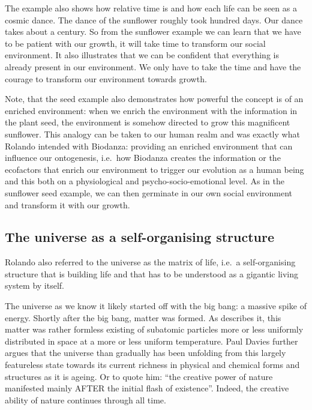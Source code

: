 \documentclass[
  11pt,
]{book}
\begin{document}
The example also shows how relative time is and how each life can be seen as a cosmic dance. The dance of the sunflower roughly took hundred days. Our dance takes about a century. So from the sunflower example we can learn that we have to be patient with our growth, it will take time to transform our social environment. It also illustrates that we can be confident that everything is already present in our environment. We only have to take the time and have the courage to transform our environment towards growth.

Note, that the seed example also demonstrates how powerful the concept is of an enriched environment: when we enrich the environment with the information in the plant seed, the environment is somehow directed to grow this magnificent sunflower. This analogy can be taken to our human realm and was exactly what Rolando intended with Biodanza: providing an enriched environment that can influence our ontogenesis, i.e.~how Biodanza creates the information or the ecofactors that enrich our environment to trigger our evolution as a human being and this both on a physiological and psycho-socio-emotional level. As in the sunflower seed example, we can then germinate in our own social environment and transform it with our growth.

\hypertarget{the-universe-as-a-self-organising-structure}{%
\subsection{The universe as a self-organising structure}\label{the-universe-as-a-self-organising-structure}}

Rolando also referred to the universe as the matrix of life, i.e.~a self-organising structure that is building life and that has to be understood as a gigantic living system by itself.

The universe as we know it likely started off with the big bang: a massive spike of energy. Shortly after the big bang, matter was formed. As \citet{davies1987} describes it, this matter was rather formless existing of subatomic particles more or less uniformly distributed in space at a more or less uniform temperature.
Paul Davies further argues that the universe than gradually has been unfolding from this largely featureless state towards its current richness in physical and chemical forms and structures as it is ageing. Or to quote him: ``the creative power of nature manifested mainly AFTER the initial flash of existence''. Indeed, the creative ability of nature continues through all time.
\end{document}
